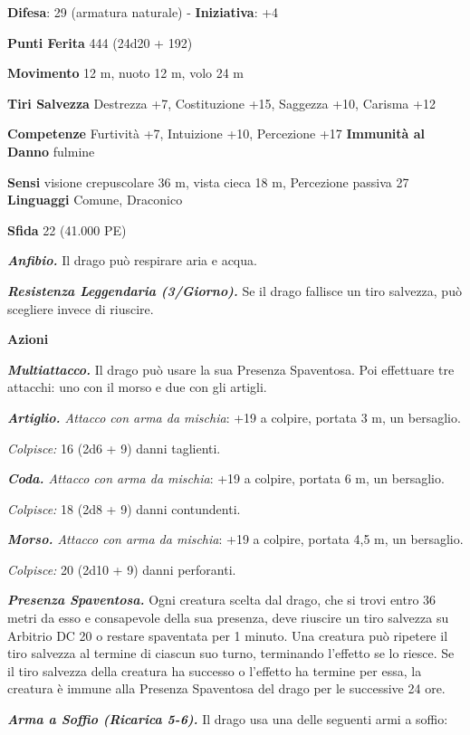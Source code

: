 \begin{multicols}{2}
\textbf{Difesa}: 29 (armatura naturale) - \textbf{Iniziativa}: +4

\textbf{Punti Ferita} 444 (24d20 + 192)

\textbf{Movimento} 12 m, nuoto 12 m, volo 24 m

\textbf{Tiri Salvezza} Destrezza +7, Costituzione +15, Saggezza +10,
Carisma +12

\textbf{Competenze} Furtività +7, Intuizione +10, Percezione +17
\textbf{Immunità al Danno} fulmine

\textbf{Sensi} visione crepuscolare 36 m, vista cieca 18 m, Percezione passiva
27 \textbf{Linguaggi} Comune, Draconico

\textbf{Sfida} 22 (41.000 PE)

\emph{\textbf{Anfibio.}} Il drago può respirare aria e acqua.

\emph{\textbf{Resistenza Leggendaria (3/Giorno).}} Se il drago fallisce
un tiro salvezza, può scegliere invece di riuscire.

\textbf{Azioni}

\emph{\textbf{Multiattacco.}} Il drago può usare la sua Presenza
Spaventosa. Poi effettuare tre attacchi: uno con il morso e due con gli
artigli.

\emph{\textbf{Artiglio.} Attacco con arma da mischia}: +19 a colpire,
portata 3 m, un bersaglio.

\emph{Colpisce:} 16 (2d6 + 9) danni taglienti.

\emph{\textbf{Coda.} Attacco con arma da mischia}: +19 a colpire,
portata 6 m, un bersaglio.

\emph{Colpisce:} 18 (2d8 + 9) danni contundenti.

\emph{\textbf{Morso.} Attacco con arma da mischia}: +19 a colpire,
portata 4,5 m, un bersaglio.

\emph{Colpisce:} 20 (2d10 + 9) danni perforanti.

\emph{\textbf{Presenza Spaventosa.}} Ogni creatura scelta dal drago, che
si trovi entro 36 metri da esso e consapevole della sua presenza, deve
riuscire un tiro salvezza su Arbitrio DC 20 o restare spaventata per 1
minuto. Una creatura può ripetere il tiro salvezza al termine di ciascun
suo turno, terminando l'effetto se lo riesce. Se il tiro salvezza della
creatura ha successo o l'effetto ha termine per essa, la creatura è
immune alla Presenza Spaventosa del drago per le successive 24 ore.

\emph{\textbf{Arma a Soffio (Ricarica 5-6).}} Il drago usa una delle
seguenti armi a soffio:


\end{multicols}

